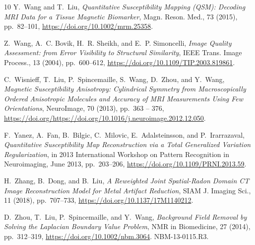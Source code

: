 \documentclass[reqno]{siamonline1116}
\numberwithin{theorem}{section}
\numberwithin{equation}{section}
\begin{document}
\begin{thebibliography}{10}
{\sc Y.~Wang and T.~Liu}, {\em {Quantitative Susceptibility Mapping (QSM):
  Decoding MRI Data for a Tissue Magnetic Biomarker}}, Magn. Reson. Med., 73
  (2015), pp.~82--101, \url{https://doi.org/10.1002/mrm.25358}.

{\sc Z.~Wang, A.~C. Bovik, H.~R. Sheikh, and E.~P. Simoncelli}, {\em {Image
  Quality Assessment: from Error Visibility to Structural Similarity}}, IEEE
  Trans. Image Process., 13 (2004), pp.~600--612,
  \url{https://doi.org/10.1109/TIP.2003.819861}.

{\sc C.~Wisnieff, T.~Liu, P.~Spincemaille, S.~Wang, D.~Zhou, and Y.~Wang}, {\em
  {Magnetic Susceptibility Anisotropy: Cylindrical Symmetry from
  Macroscopically Ordered Anisotropic Molecules and Accuracy of MRI
  Measurements Using Few Orientations}}, NeuroImage, 70 (2013), pp.~363 -- 376,
  \url{https://doi.org/https://doi.org/10.1016/j.neuroimage.2012.12.050}.

{\sc F.~Yanez, A.~Fan, B.~Bilgic, C.~Milovic, E.~Adalsteinsson, and
  P.~Irarrazaval}, {\em {Quantitative Susceptibility Map Reconstruction via a
  Total Generalized Variation Regularization}}, in 2013 International Workshop
  on Pattern Recognition in Neuroimaging, June 2013, pp.~203--206,
  \url{https://doi.org/10.1109/PRNI.2013.59}.

{\sc H.~Zhang, B.~Dong, and B.~Liu}, {\em {A Reweighted Joint Spatial-Radon
  Domain {CT} Image Reconstruction Model for Metal Artifact Reduction}}, SIAM
  J. Imaging Sci., 11 (2018), pp.~707--733,
  \url{https://doi.org/10.1137/17M1140212}.

{\sc D.~Zhou, T.~Liu, P.~Spincemaille, and Y.~Wang}, {\em {Background Field
  Removal by Solving the Laplacian Boundary Value Problem}}, NMR in
  Biomedicine, 27 (2014), pp.~312--319, \url{https://doi.org/10.1002/nbm.3064}.
\newblock NBM-13-0115.R3.

\end{thebibliography}
\end{document}
